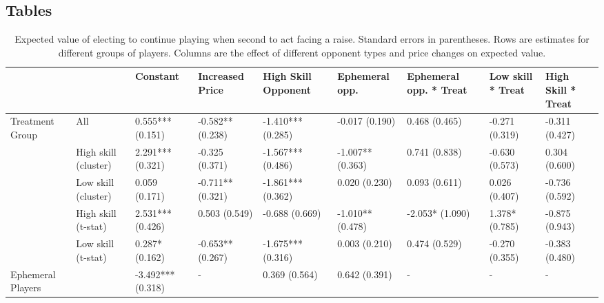 \documentclass[12pt]{article}
\begin{document}
\begin{landscape}
\section*{Tables} \label{sec:tables}
\begin{table}[hp]
\begin{tabular}{ p{1.75cm} | p{2cm} | p{2cm} | p{2cm} | p{2cm} | p{2cm} | p{2cm} | p{2cm} | p{2cm} |}
	 & 
	 &
	Constant &
	Increased Price &
	High Skill Opponent &
	Ephemeral opp. &
	Ephemeral opp. * Treat &
	Low skill * Treat &
	High Skill * Treat \\
	\hline
	\multirow{5}{2cm}{Treatment Group} & 
	All & 
	0.555*** (0.151) & 
	-0.582** (0.238) &
	-1.410*** 
	(0.285) &
	-0.017 
	(0.190) &
	0.468 
	(0.465) &
	-0.271 
	(0.319) &
	-0.311 
	(0.427)
	 \\
	 &
	 High skill (cluster) &
	 2.291*** (0.321) &
	 -0.325 (0.371) &
	 -1.567*** (0.486) &
	 -1.007** (0.363) &
	 0.741 (0.838) &
	 -0.630 (0.573) &
	 0.304 (0.600)
	 \\
	  &
	 Low skill (cluster) &
	 0.059 (0.171) &
	 -0.711** (0.321) &
	 -1.861*** (0.362) &
	 0.020 (0.230) &
	 0.093 (0.611) &
	 0.026 (0.407) &
	 -0.736 (0.592)
	 \\
	  &
	 High skill (t-stat) & 
	 2.531*** (0.426) & 
	 0.503 (0.549) &
	 -0.688 (0.669) &
	 -1.010** (0.478) & 
	 -2.053* (1.090) &
	 1.378* (0.785) & 
	 -0.875 (0.943)
	 \\
	  &
     Low skill (t-stat) &
     0.287* (0.162) &
     -0.653** (0.267) &
     -1.675*** (0.316) &
     0.003 (0.210) &
     0.474 (0.529) &
     -0.270 (0.355) &
     -0.383 (0.480)
     \\
     \hline
     Ephemeral Players&
      &
     -3.492*** (0.318) &
     - &
     0.369 (0.564) &
     0.642 (0.391) &
     -  &
     -  &
     -
\end{tabular}
\caption{Expected value of electing to continue playing when second to act facing a raise. Standard errors in parentheses. Rows are estimates for different groups of players. Columns are the effect of different opponent types and price changes on expected value.}
\label{table:1}
\end{table}
\end{landscape}
\end{document}
